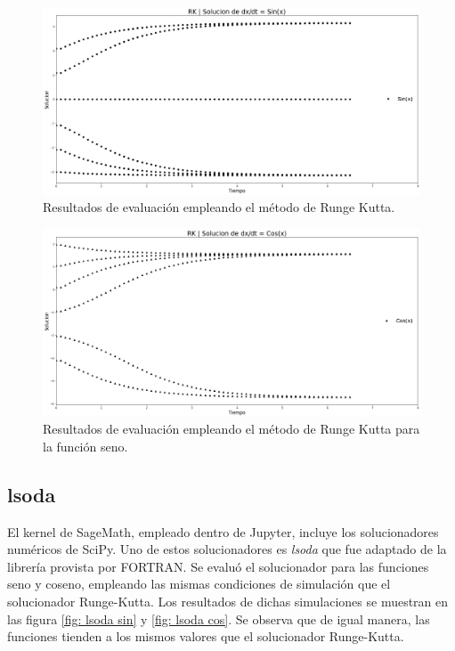 \documentclass[12pt,letterpaper]{article}
\begin{document}
\begin{figure}[h]
 \centering
 \includegraphics[scale=0.25]{img/rk_sin.png}
 \caption{Resultados de evaluación empleando el método de Runge Kutta.}
 \label{fig: rk sin}
\end{figure}

\begin{figure}[h]
 \centering
 \includegraphics[scale=0.25]{img/rk_cos.png}
 \caption{Resultados de evaluación empleando el método de Runge Kutta para la función seno.}
 \label{fig: rk cos}
\end{figure}

\pagebreak

\subsection{lsoda}
El kernel de SageMath, empleado dentro de Jupyter, incluye los solucionadores numéricos de SciPy. Uno de estos solucionadores es  \emph{lsoda} que fue adaptado de la librería provista por FORTRAN.
Se evaluó el solucionador para las funciones seno y coseno, empleando las mismas 
condiciones de simulación que el solucionador Runge-Kutta. Los resultados de dichas simulaciones se muestran en las figura \ref{fig: lsoda sin} y \ref{fig: lsoda cos}.
Se observa que de igual manera, las funciones tienden a los mismos valores que
el solucionador Runge-Kutta.
\end{document}
